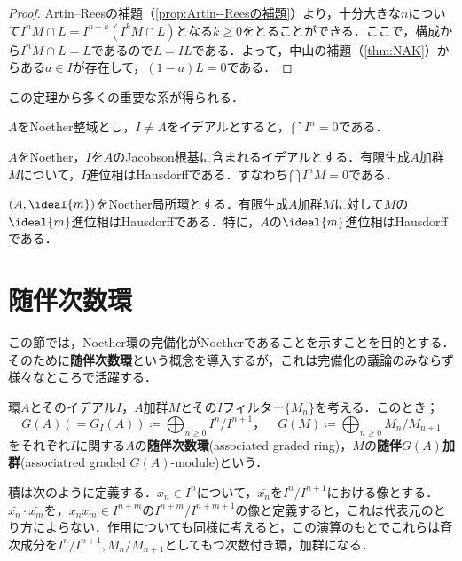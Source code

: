 \begin{proof}
	Artin--Reesの補題（\ref{prop:Artin--Reesの補題}）より，十分大きな$n$について$I^n M\cap L=I^{n-k}(I^kM\cap L)$となる$k\geq0$をとることができる．ここで，構成から$I^n M\cap L=L$であるので$L=IL$である．よって，中山の補題（\ref{thm:NAK}）からある$a\in I$が存在して，$(1-a)L=0$である．
\end{proof}

この定理から多くの重要な系が得られる．

\begin{cor}
	$A$をNoether整域とし，$I\neq A$をイデアルとすると，$\bigcap I^n=0$である．
\end{cor}

\begin{cor}\label{cor:Krullの交叉定理の系}
	$A$をNoether，$I$を$A$のJacobson根基に含まれるイデアルとする．有限生成$A$加群$M$について，$I$進位相はHausdorffである．すなわち$\bigcap I^nM=0$である．
\end{cor}

\begin{cor}
	$(A,\ideal{m})$をNoether局所環とする．有限生成$A$加群$M$に対して$M$の$\ideal{m}$進位相はHausdorffである．特に，$A$の$\ideal{m}$進位相はHausdorffである．
\end{cor}
\section{随伴次数環}

この節では，Noether環の完備化がNoetherであることを示すことを目的とする．そのために\textbf{随伴次数環}という概念を導入するが，これは完備化の議論のみならず様々なところで活躍する．

\begin{defi}[随伴次数環]\label{defi:随伴次数環}
	環$A$とそのイデアル$I$，$A$加群$M$とその$I$フィルター$\{M_n\}$を考える．このとき；
	\[G(A)(=G_I(A))\coloneq\bigoplus_{n\geq0}I^n/I^{n+1}，\quad G(M)\coloneq\bigoplus_{n\geq0}M_n/M_{n+1}\]
	をそれぞれ$I$に関する$A$の\textbf{随伴次数環}(associated graded ring)，$M$の\textbf{随伴}$G(A)$\textbf{加群}(associatred graded $G(A)$-module)という．
\end{defi}

積は次のように定義する．$x_n\in I^n$について，$\bar{x_n}$を$I^n/I^{n+1}$における像とする．$\bar{x_n}\cdot\bar{x_m}$を，$x_nx_m\in I^{n+m}$の$I^{n+m}/I^{n+m+1}$の像と定義すると，これは代表元のとり方によらない．作用についても同様に考えると，この演算のもとでこれらは斉次成分を$I^n/I^{n+1},M_n/M_{n+1}$としてもつ次数付き環，加群になる．

